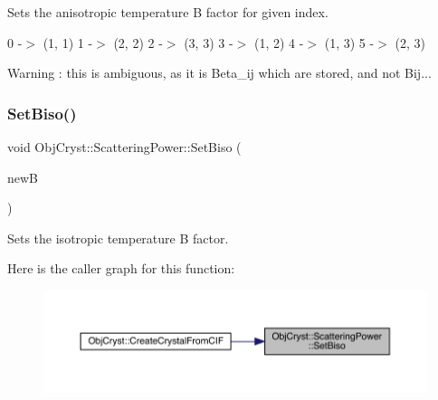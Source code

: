 Sets the anisotropic temperature B factor for given index. 

0 -\/$>$ (1, 1) 1 -\/$>$ (2, 2) 2 -\/$>$ (3, 3) 3 -\/$>$ (1, 2) 4 -\/$>$ (1, 3) 5 -\/$>$ (2, 3)

\begin{DoxyWarning}{Warning}
\+: this is ambiguous, as it is Beta\+\_\+ij which are stored, and not Bij... 
\end{DoxyWarning}
\mbox{\label{class_obj_cryst_1_1_scattering_power_a497e942601480325ef6f8f345f0e1517}} 
\subsubsection{\texorpdfstring{SetBiso()}{SetBiso()}}
{\footnotesize\ttfamily void Obj\+Cryst\+::\+Scattering\+Power\+::\+Set\+Biso (\begin{DoxyParamCaption}\item[{const R\+E\+AL}]{newB }\end{DoxyParamCaption})\hspace{0.3cm}{\ttfamily [virtual]}}



Sets the isotropic temperature B factor. 

Here is the caller graph for this function\+:
\nopagebreak
\begin{figure}[H]
\begin{center}
\leavevmode
\includegraphics[width=350pt]{class_obj_cryst_1_1_scattering_power_a497e942601480325ef6f8f345f0e1517_icgraph}
\end{center}
\end{figure}
\mbox{\label{class_obj_cryst_1_1_scattering_power_aeba30efe61155572ffdada1121578bc9}} 
